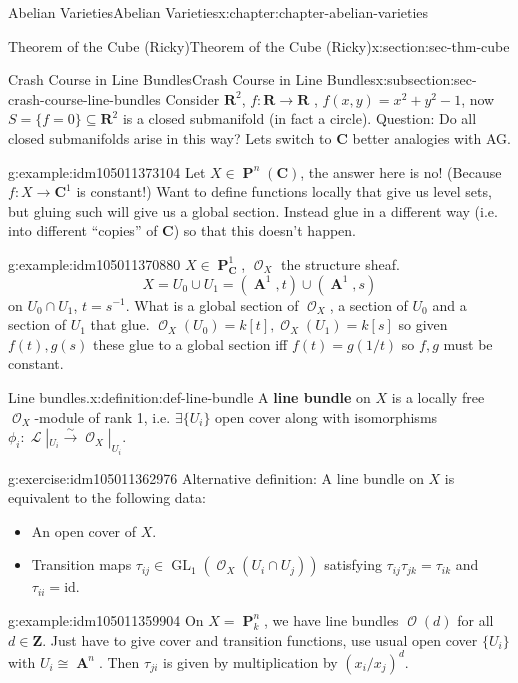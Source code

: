 \documentclass[oneside,10pt,]{book}
\newcommand{\terminology}[1]{\textbf{#1}}
\numberwithin{equation}{section}
\newcommand{\sheaf}[1]{\operatorname{\mathcal{#1}}}
\newcommand{\ZZ}{\mathbf{Z}}
\newcommand{\RR}{\mathbf{R}}
\newcommand{\CC}{\mathbf{C}}
\newcommand{\id}{\mathrm{id}}
\DeclareMathOperator{\aff}{\mathbf{A}}
\DeclareMathOperator{\PP}{\mathbf{P}}
\DeclareMathOperator{\GL}{GL}
\begin{document}
\begin{chapterptx}{Abelian Varieties}{}{Abelian Varieties}{}{}{x:chapter:chapter-abelian-varieties}
\begin{sectionptx}{Theorem of the Cube (Ricky)}{}{Theorem of the Cube (Ricky)}{}{}{x:section:sec-thm-cube}
\begin{subsectionptx}{Crash Course in Line Bundles}{}{Crash Course in Line Bundles}{}{}{x:subsection:sec-crash-course-line-bundles}
Consider \(\RR^2\), \(f\colon \RR \to \RR\) , \(f(x,y) = x^2 + y^2 -1\), now \(S = \{f=0\}\subseteq \RR^2\) is a closed submanifold (in fact a circle). Question: Do all closed submanifolds arise in this way? Lets switch to \(\CC\) better analogies with AG.%
\begin{example}{}{g:example:idm105011373104}%
Let \(X\in \PP^n(\CC)\), the answer here is no! (Because \(f\colon X \to \CC^1\) is constant!) Want to define functions locally that give us level sets, but gluing such will give us a global section. Instead glue in a different way (i.e. into different ``copies'' of \(\CC\)) so that this doesn't happen.%
\end{example}
\begin{example}{}{g:example:idm105011370880}%
\(X\in \PP_\CC^1\), \(\sheaf O_X\) the structure sheaf.%
\begin{equation*}
X = U_0 \cup U_1 = (\aff^1,t) \cup(\aff^1,s)
\end{equation*}
on \(U_0\cap U_1\), \(t = s^{-1}\). What is a global section of \(\sheaf O_X\), a section of \(U_0\) and a section of \(U_1\) that glue. \(\sheaf O_X(U_0) =  k[t], \sheaf O_X(U_1) =  k[s]\) so given \(f(t), g(s)\) these glue to a global section iff \(f(t) = g(1/t)\) so \(f,g\) must be constant.%
\end{example}
\begin{definition}{Line bundles.}{x:definition:def-line-bundle}%
A \terminology{line bundle} on \(X\) is a locally free \(\sheaf O_X\)-module of rank 1, i.e. \(\exists \{U_i\}\) open cover along with isomorphisms \(\phi_i\colon \sheaf L|_{U_i} \xrightarrow\sim \sheaf O_X |_{U_i}\).%
\end{definition}
\begin{inlineexercise}{}{g:exercise:idm105011362976}%
Alternative definition: A line bundle on \(X\) is equivalent to the following data:%
\begin{itemize}[label=\textbullet]
\item{}An open cover of \(X\).%
\item{}Transition maps \(\tau_{ij} \in \GL_1(\sheaf O_X(U_i\cap U_j))\) satisfying \(\tau_{ij}\tau_{jk} =\tau_{ik}\) and \(\tau_{ii} = \id\).%
\end{itemize}
%
\end{inlineexercise}
\begin{example}{}{g:example:idm105011359904}%
On \(X = \PP^n_k\), we have line bundles \(\sheaf O(d)\) for all \(d\in \ZZ\). Just have to give cover and transition functions, use usual open cover \(\{U_i\}\) with \(U_i\cong \aff^n\). Then \(\tau_{ji}\) is given by multiplication by \((x_i/x_j)^d\).%

\end{example}
\end{subsectionptx}
\end{sectionptx}
\end{chapterptx}
\end{document}
